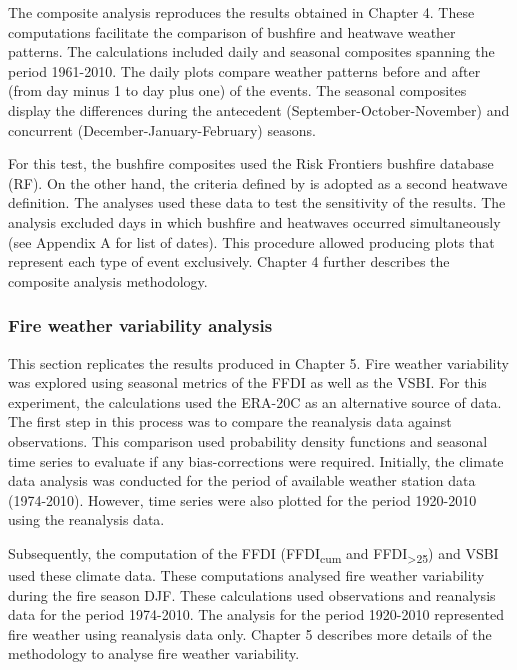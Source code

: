 The composite analysis reproduces the results obtained in Chapter
4. These computations facilitate the comparison of bushfire and heatwave
weather patterns. The calculations included daily and seasonal composites
spanning the period 1961-2010. The daily plots compare weather patterns
before and after (from day minus 1 to day plus one) of the events.
The seasonal composites display the differences during the antecedent
(September-October-November) and concurrent (December-January-February)
seasons. 

For this test, the bushfire composites used the Risk Frontiers bushfire
database (RF). On the other hand, the criteria defined by \citet{Pezza2012}
is adopted as a second heatwave definition. The analyses used these
data to test the sensitivity of the results. The analysis excluded
days in which bushfire and heatwaves occurred simultaneously (see
Appendix A for list of dates). This procedure allowed producing plots
that represent each type of event exclusively. Chapter 4 further describes
the composite analysis methodology.


\subsubsection{Fire weather variability analysis}

\LyXZeroWidthSpace This section replicates the results produced in
Chapter 5. Fire weather variability was explored using seasonal metrics
of the FFDI as well as the VSBI. For this experiment, the calculations
used the ERA-20C as an alternative source of data. The first step
in this process was to compare the reanalysis data against observations.
This comparison used probability density functions and seasonal time
series to evaluate if any bias-corrections were required. Initially,
the climate data analysis was conducted for the period of available
weather station data (1974-2010). However, time series were also plotted
for the period 1920-2010 using the reanalysis data.

Subsequently, the computation of the FFDI (FFDI\textsubscript{cum}
and FFDI\textsubscript{>25}) and VSBI used these climate data. These
computations analysed fire weather variability during the fire season
DJF. These calculations used observations and reanalysis data for
the period 1974-2010. The analysis for the period 1920-2010 represented
fire weather using reanalysis data only. Chapter 5 describes more
details of the methodology to analyse fire weather variability.


